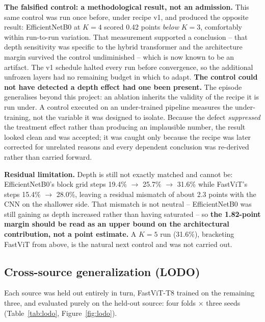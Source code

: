 \documentclass{article}
\begin{document}
\textbf{The falsified control: a methodological result, not an admission.} This same control was run once
before, under recipe v1, and produced the opposite result: EfficientNetB0 at $K{=}4$ scored 0.42 points
\textit{below} $K{=}3$, comfortably within run-to-run variation. That measurement supported a conclusion --
that depth sensitivity was specific to the hybrid transformer and the architecture margin survived the
control undiminished -- which is now known to be an artifact. The v1 schedule halted every run before
convergence, so the additional unfrozen layers had no remaining budget in which to adapt. \textbf{The
control could not have detected a depth effect had one been present.} The episode generalises beyond this
project: an ablation inherits the validity of the recipe it is run under. A control executed on an
under-trained pipeline measures the under-training, not the variable it was designed to isolate. Because
the defect \textit{suppressed} the treatment effect rather than producing an implausible number, the
result looked clean and was accepted; it was caught only because the recipe was later corrected for
unrelated reasons and every dependent conclusion was re-derived rather than carried forward.

\textbf{Residual limitation.} Depth is still not exactly matched and cannot be: EfficientNetB0's block grid
steps 19.4\% $\rightarrow$ 25.7\% $\rightarrow$ 31.6\% while FastViT's steps 15.4\% $\rightarrow$ 28.0\%,
leaving a residual mismatch of about 2.3 points with the CNN on the shallower side. That mismatch is not
neutral -- EfficientNetB0 was still gaining as depth increased rather than having saturated -- so
\textbf{the 1.82-point margin should be read as an upper bound on the architectural contribution, not a
point estimate.} A $K{=}5$ run (31.6\%), bracketing FastViT from above, is the natural next control and
was not carried out.

\subsection{Cross-source generalization (LODO)}
\label{sec:lodo}

Each source was held out entirely in turn, FastViT-T8 trained on the remaining three, and evaluated purely
on the held-out source: four folds $\times$ three seeds (Table~\ref{tab:lodo}, Figure~\ref{fig:lodo}).
\end{document}
